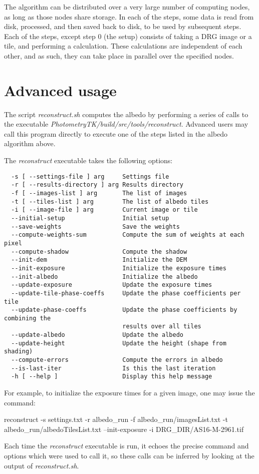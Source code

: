 \documentclass{article}
\begin{document}
\noindent The algorithm can be distributed over a very large number of
computing nodes, as long as those nodes share storage. In each of the
steps, some data is read from disk, processed, and then saved back to disk,
to be used by subsequent steps. Each of the steps, except step 0 (the
setup) consists of taking a DRG image or a tile, and performing a
calculation. These calculations are independent of each other, and as
such, they can take place in parallel over the specified nodes.

\section{Advanced usage}

The script {\it reconstruct.sh} computes the albedo by performing a
series of calls to the executable
{\it PhotometryTK/build/src/tools/reconstruct}. Advanced users may call this
program directly to execute one of the steps listed in the albedo
algorithm above. 

The {\it reconstruct} executable takes the following options:

\begin{verbatim}
  -s [ --settings-file ] arg     Settings file
  -r [ --results-directory ] arg Results directory
  -f [ --images-list ] arg       The list of images
  -t [ --tiles-list ] arg        The list of albedo tiles
  -i [ --image-file ] arg        Current image or tile
  --initial-setup                Initial setup
  --save-weights                 Save the weights
  --compute-weights-sum          Compute the sum of weights at each pixel
  --compute-shadow               Compute the shadow
  --init-dem                     Initialize the DEM
  --init-exposure                Initialize the exposure times
  --init-albedo                  Initialize the albedo
  --update-exposure              Update the exposure times
  --update-tile-phase-coeffs     Update the phase coefficients per tile
  --update-phase-coeffs          Update the phase coefficients by combining the
                                 results over all tiles
  --update-albedo                Update the albedo
  --update-height                Update the height (shape from shading)
  --compute-errors               Compute the errors in albedo
  --is-last-iter                 Is this the last iteration
  -h [ --help ]                  Display this help message
\end{verbatim}

For example, to initialize the exposure times for a given image, one may
issue the command:

\begin{center}
reconstruct -s settings.txt -r albedo\_run -f albedo\_run/imagesList.txt -t albedo\_run/albedoTilesList.txt --init-exposure -i DRG\_DIR/AS16-M-2961.tif
\end{center}

Each time the {\it reconstruct} executable is run, it echoes the precise
command and options which were used to call it, so these calls can be
inferred by looking at the output of {\it reconstruct.sh}. 

% 
\end{document}
